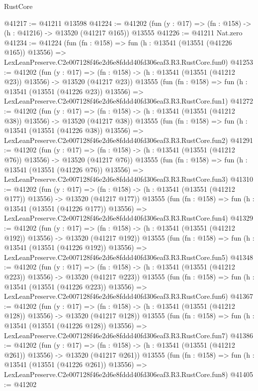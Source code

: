 \begin{lexlean}{RustCore}
\begin{coremodule}
@41217 := @41211 @13598
@41224 := @41202 (fun (y : @17) => (fn : @158) -> (h : @41216) -> @13520 (@41217 @165)) @13555
@41226 := @41211 Nat.zero
@41234 := @41224
    (fun (fn : @158) =>
    fun (h : @13541 (@13551 (@41226 @165)) @13556) =>
    LexLeanPreserve.C2e007128f46e2d6e8fddd40fd306eaf3.R3.RustCore.fun0)
@41253 := @41202
    (fun (y : @17) =>
    (fn : @158) -> (h : @13541 (@13551 (@41212 @23)) @13556) -> @13520 (@41217 @23))
    @13555
    (fun (fn : @158) =>
    fun (h : @13541 (@13551 (@41226 @23)) @13556) =>
    LexLeanPreserve.C2e007128f46e2d6e8fddd40fd306eaf3.R3.RustCore.fun1)
@41272 := @41202
    (fun (y : @17) =>
    (fn : @158) -> (h : @13541 (@13551 (@41212 @38)) @13556) -> @13520 (@41217 @38))
    @13555
    (fun (fn : @158) =>
    fun (h : @13541 (@13551 (@41226 @38)) @13556) =>
    LexLeanPreserve.C2e007128f46e2d6e8fddd40fd306eaf3.R3.RustCore.fun2)
@41291 := @41202
    (fun (y : @17) =>
    (fn : @158) -> (h : @13541 (@13551 (@41212 @76)) @13556) -> @13520 (@41217 @76))
    @13555
    (fun (fn : @158) =>
    fun (h : @13541 (@13551 (@41226 @76)) @13556) =>
    LexLeanPreserve.C2e007128f46e2d6e8fddd40fd306eaf3.R3.RustCore.fun3)
@41310 := @41202
    (fun (y : @17) =>
    (fn : @158) -> (h : @13541 (@13551 (@41212 @177)) @13556) -> @13520 (@41217 @177))
    @13555
    (fun (fn : @158) =>
    fun (h : @13541 (@13551 (@41226 @177)) @13556) =>
    LexLeanPreserve.C2e007128f46e2d6e8fddd40fd306eaf3.R3.RustCore.fun4)
@41329 := @41202
    (fun (y : @17) =>
    (fn : @158) -> (h : @13541 (@13551 (@41212 @192)) @13556) -> @13520 (@41217 @192))
    @13555
    (fun (fn : @158) =>
    fun (h : @13541 (@13551 (@41226 @192)) @13556) =>
    LexLeanPreserve.C2e007128f46e2d6e8fddd40fd306eaf3.R3.RustCore.fun5)
@41348 := @41202
    (fun (y : @17) =>
    (fn : @158) -> (h : @13541 (@13551 (@41212 @223)) @13556) -> @13520 (@41217 @223))
    @13555
    (fun (fn : @158) =>
    fun (h : @13541 (@13551 (@41226 @223)) @13556) =>
    LexLeanPreserve.C2e007128f46e2d6e8fddd40fd306eaf3.R3.RustCore.fun6)
@41367 := @41202
    (fun (y : @17) =>
    (fn : @158) -> (h : @13541 (@13551 (@41212 @128)) @13556) -> @13520 (@41217 @128))
    @13555
    (fun (fn : @158) =>
    fun (h : @13541 (@13551 (@41226 @128)) @13556) =>
    LexLeanPreserve.C2e007128f46e2d6e8fddd40fd306eaf3.R3.RustCore.fun7)
@41386 := @41202
    (fun (y : @17) =>
    (fn : @158) -> (h : @13541 (@13551 (@41212 @261)) @13556) -> @13520 (@41217 @261))
    @13555
    (fun (fn : @158) =>
    fun (h : @13541 (@13551 (@41226 @261)) @13556) =>
    LexLeanPreserve.C2e007128f46e2d6e8fddd40fd306eaf3.R3.RustCore.fun8)
@41405 := @41202

\end{coremodule}
\end{lexlean}
